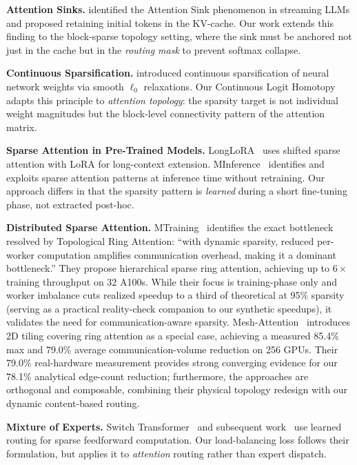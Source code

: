\documentclass[11pt,a4paper]{article}
\begin{document}
\textbf{Attention Sinks.} \citet{xiao2023efficient} identified the Attention Sink phenomenon in streaming LLMs and proposed retaining initial tokens in the KV-cache. Our work extends this finding to the block-sparse topology setting, where the sink must be anchored not just in the cache but in the \emph{routing mask} to prevent softmax collapse.

\textbf{Continuous Sparsification.} \citet{savarese2020winning} introduced continuous sparsification of neural network weights via smooth $\ell_0$ relaxations. Our Continuous Logit Homotopy adapts this principle to \emph{attention topology}: the sparsity target is not individual weight magnitudes but the block-level connectivity pattern of the attention matrix.

\textbf{Sparse Attention in Pre-Trained Models.} LongLoRA~\citep{chen2024longlora} uses shifted sparse attention with LoRA for long-context extension. MInference~\citep{jiang2024minference} identifies and exploits sparse attention patterns at inference time without retraining. Our approach differs in that the sparsity pattern is \emph{learned} during a short fine-tuning phase, not extracted post-hoc.

\textbf{Distributed Sparse Attention.} MTraining~\citep{li2025mtraining} identifies the exact bottleneck resolved by Topological Ring Attention: ``with dynamic sparsity, reduced per-worker computation amplifies communication overhead, making it a dominant bottleneck.'' They propose hierarchical sparse ring attention, achieving up to $6\times$ training throughput on 32 A100s. While their focus is training-phase only and worker imbalance cuts realized speedup to a third of theoretical at 95\% sparsity (serving as a practical reality-check companion to our synthetic speedups), it validates the need for communication-aware sparsity. Mesh-Attention~\citep{chen2025meshattention} introduces 2D tiling covering ring attention as a special case, achieving a measured 85.4\% max and 79.0\% average communication-volume reduction on 256 GPUs. Their 79.0\% real-hardware measurement provides strong converging evidence for our 78.1\% analytical edge-count reduction; furthermore, the approaches are orthogonal and composable, combining their physical topology redesign with our dynamic content-based routing.

\textbf{Mixture of Experts.} Switch Transformer~\citep{fedus2022switch} and subsequent work~\citep{jiang2024mixtral} use learned routing for sparse feedforward computation. Our load-balancing loss follows their formulation, but applies it to \emph{attention} routing rather than expert dispatch.
\end{document}

